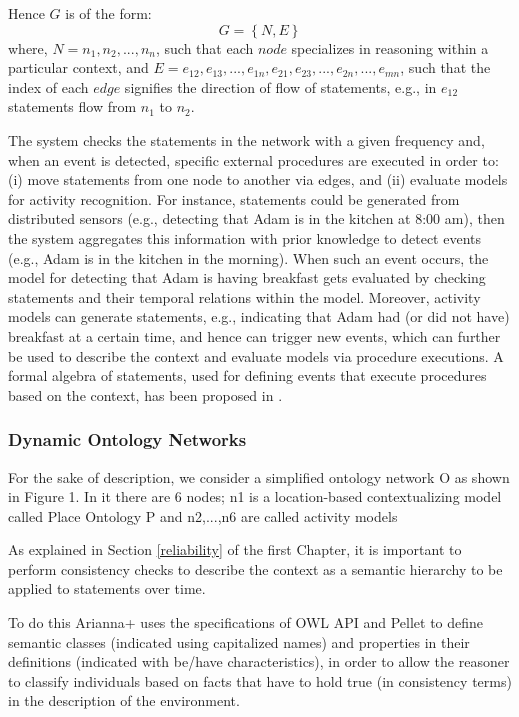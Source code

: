 \documentclass{thesisreport}
\begin{document}
 Hence $G$ is of the form:
 \begin{equation}
     G = \left \{ N, E \right \}
 \end{equation}
 where, $N = n_1, n_2, ... , n_n$, such that each $node$ specializes in reasoning within a particular context, and $ E = e_{12},e_{13},...,e_{1n},e_{21},e_{23},...,e_{2n},...,e_{mn}$, such that the index of each $edge$ signifies the direction of flow of statements, e.g., in $e_{12}$ statements flow from $n_1$ to $n_2$. 
 
 The system checks the statements in the network with a given frequency and, when an event is detected, specific external procedures are executed in order to: (i) move statements from one node to another via edges, and (ii) evaluate models for activity recognition. For instance, statements could be generated from distributed sensors (e.g., detecting that Adam is in the kitchen at 8:00 am), then the system aggregates this information with prior knowledge to detect events (e.g., Adam is in the kitchen in the morning). When such an event occurs, the model for detecting that Adam is having breakfast gets evaluated by checking statements and their temporal relations within the model.
 Moreover, activity models can generate statements, e.g., indicating that Adam had (or did not have) breakfast at a certain time, and hence can trigger new events, which can further be used to describe the context and evaluate models via procedure executions. A formal algebra of statements, used for defining events that execute procedures based on the context, has been proposed in \cite{buoncompagni2017towards}.
 
 \subsubsection{Dynamic Ontology Networks}
 For the sake of description, we consider a simplified ontology network O as shown in Figure 1. In it there are 6 nodes; n1 is a location-based contextualizing model called Place Ontology P and n2,...,n6 are called activity models
 
 
 
 
 As explained in Section \ref{reliability} of the first Chapter, it is important to perform consistency checks to describe the context as a semantic hierarchy to be applied to statements over time.
 
 To do this Arianna+ uses the specifications of OWL API and Pellet to define semantic classes (indicated using capitalized names) and properties in their definitions (indicated with be/have characteristics), in order to allow the reasoner to classify individuals based on facts that have to hold true (in consistency terms) in the description of the environment. 
 
\end{document}
